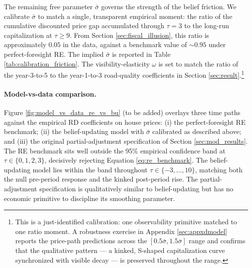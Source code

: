 The remaining free parameter $\bar{\sigma}$ governs the strength of the belief friction. We calibrate $\bar{\sigma}$ to match a single, transparent empirical moment: the ratio of the cumulative discounted price gap accumulated through $\tau = 3$ to the long-run capitalization at $\tau \geq 9$. From Section \ref{sec:fiscal_illusion}, this ratio is approximately $0.05$ in the data, against a benchmark value of $\sim 0.95$ under perfect-foresight RE. The implied $\bar{\sigma}$ is reported in Table \ref{tab:calibration_friction}. The visibility-elasticity $\omega$ is set to match the ratio of the year-3-to-5 to the year-1-to-3 road-quality coefficients in Section \ref{sec:result}.\footnote{This is a just-identified calibration: one observability primitive matched to one ratio moment. A robustness exercise in Appendix \ref{sec:appxdmodel} reports the price-path predictions across the $[0.5 \bar{\sigma}, 1.5 \bar{\sigma}]$ range and confirms that the qualitative pattern --- a kinked, S-shaped capitalization curve synchronized with visible decay --- is preserved throughout the range.}

\begin{table}[H]
\centering
\caption{Belief-updating microfoundation: parameter calibration.}
\label{tab:calibration_friction}

\end{table}

\paragraph{Model-vs-data comparison.}
Figure \ref{fig:model_vs_data_re_vs_bu} (to be added) overlays three time paths against the empirical RD coefficients on house prices: (i) the perfect-foresight RE benchmark; (ii) the belief-updating model with $\bar{\sigma}$ calibrated as described above; and (iii) the original partial-adjustment specification of Section \ref{sec:mod_results}. The RE benchmark sits well outside the 95\% empirical confidence band at $\tau \in \{0,1,2,3\}$, decisively rejecting Equation \ref{eq:re_benchmark}. The belief-updating model lies within the band throughout $\tau \in \{-3, \dots, 10\}$, matching both the null pre-period response and the kinked post-period rise. The partial-adjustment specification is qualitatively similar to belief-updating but has no economic primitive to discipline its smoothing parameter.


